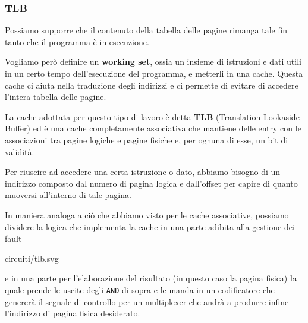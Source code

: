 \subsubsection{TLB}
Possiamo supporre che il contenuto della tabella delle pagine rimanga tale fin tanto che il
programma è in esecuzione.

Vogliamo però definire un \textbf{working set}, ossia un insieme di istruzioni e dati utili in un
certo tempo dell'esecuzione del programma, e metterli in una cache. Questa cache ci aiuta nella
traduzione degli indirizzi e ci permette di evitare di accedere l'intera tabella delle pagine.

La cache adottata per questo tipo di lavoro è detta \textbf{TLB} (Translation Lookaside Buffer) ed
è una cache completamente associativa che mantiene delle entry con le associazioni tra pagine
logiche e pagine fisiche e, per ognuna di esse, un bit di validità.

Per riuscire ad accedere una certa istruzione o dato, abbiamo bisogno di un indirizzo composto dal
numero di pagina logica e dall'offset per capire di quanto muoversi all'interno di tale pagina.

In maniera analoga a ciò che abbiamo visto per le cache associative, possiamo dividere la logica
che implementa la cache in una parte adibita alla gestione dei fault
\begin{center}
	 {circuiti/tlb.svg}
\end{center}
e in una parte per l'elaborazione del risultato (in questo caso la pagina fisica) la quale prende
le uscite degli \verb|AND| di sopra e le manda in un codificatore che genererà il segnale di
controllo per un multiplexer che andrà a produrre infine l'indirizzo di pagina fisica desiderato.
